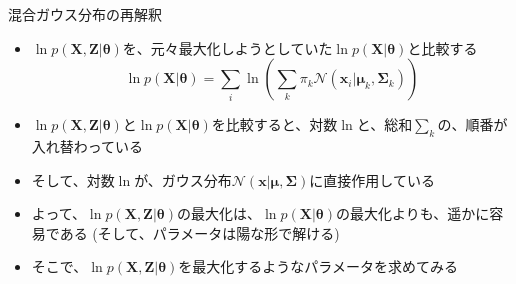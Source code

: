 \documentclass[dvipdfmx,notheorems,t]{beamer}
\begin{document}
\begin{frame}{混合ガウス分布の再解釈}
\begin{itemize}
\begin{itemize}
		\item $\ln p(\bm{X}, \bm{Z} | \bm{\theta})$を、元々最大化しようとしていた$\ln p(\bm{X} | \bm{\theta})$と比較する
		\begin{equation}
			\ln p(\bm{X} | \bm{\theta}) = \sum_i \ln \left( \sum_k \pi_k \mathcal{N}(\bm{x}_i | \bm{\mu}_k, \bm{\Sigma}_k) \right)
		\end{equation}
		
		\item $\ln p(\bm{X}, \bm{Z} | \bm{\theta})$と$\ln p(\bm{X} | \bm{\theta})$を比較すると、対数$\ln$と、総和$\displaystyle \sum_k$の、\alert{順番が入れ替わっている}
		\item そして、対数$\ln$が、ガウス分布$\mathcal{N}(\bm{x} | \bm{\mu}, \bm{\Sigma})$に\alert{直接作用している}
		\newline
		\item よって、$\ln p(\bm{X}, \bm{Z} | \bm{\theta})$の最大化は、$\ln p(\bm{X} | \bm{\theta})$の最大化よりも、\alert{遥かに容易である} (そして、パラメータは\alert{陽な形で解ける})
		\newline
		\item そこで、$\ln p(\bm{X}, \bm{Z} | \bm{\theta})$を最大化するようなパラメータを求めてみる
	\end{itemize}
\end{itemize}

\end{frame}
\end{document}
